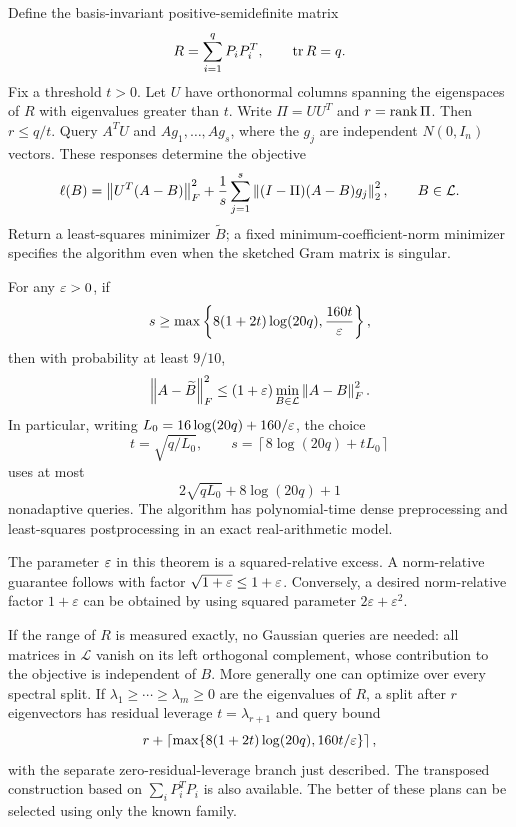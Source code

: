 \documentclass[11pt]{article}
\begin{document}
Define the basis-invariant positive-semidefinite matrix
\[
 R=\sum_{i=1}^q P_iP_i^T,\qquad \operatorname{tr} R=q.
\]
Fix a threshold $t>0$. Let $U$ have orthonormal columns spanning the eigenspaces of $R$ with eigenvalues greater than $t$. Write $\Pi=UU^T$ and $r=\operatorname{rank}\Pi$. Then $r\le q/t$. Query $A^TU$ and $Ag_1,\ldots,Ag_s$, where the $g_j$ are independent $N(0,I_n)$ vectors. These responses determine the objective
\begin{equation}\label{eq:objective}
 \ell(B)=\left\lVert U^T(A-B)\right\rVert_F^2+
       \frac1s\sum_{j=1}^s\left\lVert(I-\Pi)(A-B)g_j\right\rVert_2^2,
 \qquad B\in\mathcal L.
\end{equation}
Return a least-squares minimizer $\widetilde B$; a fixed minimum-coefficient-norm minimizer specifies the algorithm even when the sketched Gram matrix is singular.

\begin{theorem}\label{thm:main}
For any $\varepsilon>0$, if
\begin{equation}\label{eq:samples}
 s\ge\max\left\{8(1+2t)\log(20q),\frac{160t}{\varepsilon}\right\},
\end{equation}
then with probability at least $9/10$,
\begin{equation}\label{eq:relative}
 \left\lVert A-\widetilde B\right\rVert_F^2
 \le(1+\varepsilon)\min_{B\in\mathcal L}\left\lVert A-B\right\rVert_F^2.
\end{equation}
In particular, writing $L_0=16\log(20q)+160/\varepsilon$, the choice
\[
 t=\sqrt{q/L_0},\qquad
 s=\left\lceil8\log(20q)+tL_0\right\rceil
\]
uses at most
\begin{equation}\label{eq:universal}
 2\sqrt{qL_0}+8\log(20q)+1
\end{equation}
nonadaptive queries. The algorithm has polynomial-time dense preprocessing and least-squares postprocessing in an exact real-arithmetic model.
\end{theorem}

The parameter $\varepsilon$ in this theorem is a squared-relative excess. A norm-relative guarantee follows with factor $\sqrt{1+\varepsilon}\le1+\varepsilon$. Conversely, a desired norm-relative factor $1+\varepsilon$ can be obtained by using squared parameter $2\varepsilon+\varepsilon^2$.

If the range of $R$ is measured exactly, no Gaussian queries are needed: all matrices in $\mathcal L$ vanish on its left orthogonal complement, whose contribution to the objective is independent of $B$. More generally one can optimize over every spectral split. If $\lambda_1\ge\cdots\ge\lambda_m\ge0$ are the eigenvalues of $R$, a split after $r$ eigenvectors has residual leverage $t=\lambda_{r+1}$ and query bound
\[
 r+\left\lceil\max\{8(1+2t)\log(20q),160t/\varepsilon\}\right\rceil,
\]
with the separate zero-residual-leverage branch just described. The transposed construction based on $\sum_iP_i^TP_i$ is also available. The better of these plans can be selected using only the known family.
\end{document}
